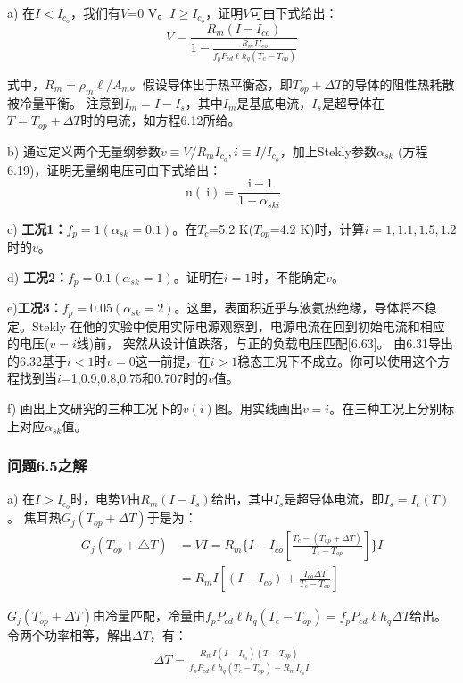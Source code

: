 a) 在$I<I_{c_o}$，我们有$V$=0 V。$I\ge I_{c_o}$，证明$V$可由下式给出：
\begin{equation}%
V=\frac{R_m(I-I_{co})}{1-\frac{R_mII_{co}}{f_pP_{cd}\ell h_q(T_c-T_{op})}}
\end{equation}

式中，$R_m=\rho_m \ell/A_m$。假设导体出于热平衡态，即$T_{op}+\Delta T$的导体的阻性热耗散被冷量平衡。
注意到$I_m=I-I_s$，其中$I_m$是基底电流，$I_s$是超导体在$T=T_{op}+\Delta T$时的电流，如方程6.12所给。

b) 通过定义两个无量纲参数$v\equiv V/R_m I_{c_o}, i\equiv I/I_{c_o}$，加上Stekly参数$\alpha_{sk}$
(方程6.19)，证明无量纲电压可由下式给出：
\begin{equation}%
\ \mathrm{u}(\ \mathrm{i})=\frac{\ \mathrm{i}-1}{1-\alpha_{ski}}
\end{equation}

c) \textbf{工况1：}$f_p=1(\alpha_{sk}=0.1)$。在$T_c$=5.2 K($T_{op}$=4.2 K)时，计算$i=1,1.1,1.5,1.2$
时的$v$。

d) \textbf{工况2：}$f_p=0.1(\alpha_{sk}=1)$。证明在$i=1$时，不能确定$v$。

e)\textbf{工况3：}$f_p=0.05(\alpha_{sk}=2)$。这里，表面积近乎与液氦热绝缘，导体将不稳定。Stekly
在他的实验中使用实际电源观察到，电源电流在回到初始电流和相应的电压($v=i$线)前，
突然从设计值跌落，与正的负载电压匹配[6.63]。
由6.31导出的6.32基于$i<1$时$v=0$这一前提，在$i>1$稳态工况下不成立。你可以使用这个方程找到当$i$=1,0.9,0.8,0.75和0.707时的$v$值。

f) 画出上文研究的三种工况下的$v(i)$图。用实线画出$v=i$。在三种工况上分别标上对应$\alpha_{sk}$值。


\subsubsection{问题6.5之解}
a) 在$I> I_{c_o}$时，电势$V$由$R_m(I-I_s)$给出，其中$I_s$是超导体电流，即$I_s=I_c(T)$。
焦耳热$G_j(T_{op}+\Delta T)$于是为：
\begin{align*}%
G_{j}(T_{op}+\triangle T)&=VI=R_m\{I-I_{co}[\frac{T_c-(T_{op}+\Delta T)}{T_c-T_{op}}]\}I\\
&=R_mI[(I-I_{co})+\frac{I_{co}\Delta T}{T_c-T_{op}}] \tag{S5.1}
\end{align*}

$G_j(T_{op}+\Delta T)$由冷量匹配，冷量由$f_pP_{cd}\ell h_q(T_c-T_{op})=f_pP_{cd}\ell h_q\Delta T$给出。
令两个功率相等，解出$\Delta T$，有：
\begin{align*}%
\Delta T=\frac{R_mI(I-I_{c_o})(T-T_{op})}{f_pP_{cd}\ell h_q(T_c-T_{op})-R_mI_{c_o}I} \tag{S5.2}
\end{align*}


